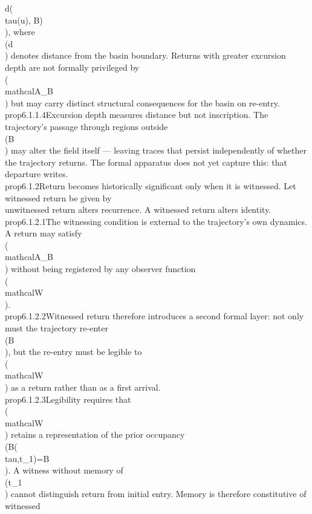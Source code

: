 {{{d(\\tau(u), B)\\), where \\(d\\) denotes distance from the basin boundary. Returns with greater excursion depth are not formally privileged by \\(\\mathcal{A}_B\\) but may carry distinct structural consequences for the basin on re-entry.}\n\n\\prop{6.1.1.4}{Excursion depth measures distance but not inscription. The trajectory's passage through regions outside \\(B\\) may alter the field itself — leaving traces that persist independently of whether the trajectory returns. The formal apparatus does not yet capture this: that departure writes.}\n\n\\prop{6.1.2}{Return becomes historically significant only when it is witnessed. Let witnessed return be given by\n\\[\n\\mathcal{A}^{\\mathcal W}_B(\\tau;t_1,t_2)\n:=\n\\mathcal{A}_B(\\tau;t_1,t_2)\\wedge \\mathcal{W}(\\tau;t_1,t_2).\n\\]\nAn unwitnessed return alters recurrence. A witnessed return alters identity.}\n\n\\prop{6.1.2.1}{The witnessing condition is external to the trajectory's own dynamics. A return may satisfy \\(\\mathcal{A}_B\\) without being registered by any observer function \\(\\mathcal{W}\\).}\n\n\\prop{6.1.2.2}{Witnessed return therefore introduces a second formal layer: not only must the trajectory re-enter \\(B\\), but the re-entry must be legible to \\(\\mathcal{W}\\) as a return rather than as a first arrival.}\n\n\\prop{6.1.2.3}{Legibility requires that \\(\\mathcal{W}\\) retains a representation of the prior occupancy \\(B(\\tau,t_1)=B\\). A witness without memory of \\(t_1\\) cannot distinguish return from initial entry. Memory is therefore constitutive of witnessed }}}
